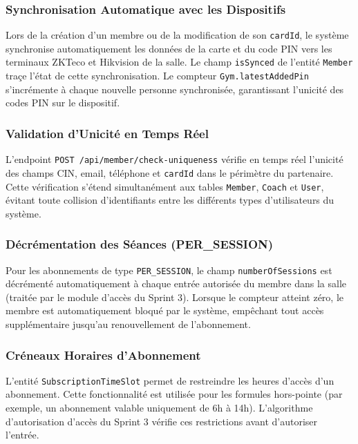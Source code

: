 ﻿\documentclass[../main.tex]{subfiles}
\begin{document}
\subsubsection{Synchronisation Automatique avec les Dispositifs}

Lors de la cr\'{e}ation d'un membre ou de la modification de son \texttt{cardId}, le syst\`{e}me synchronise automatiquement les donn\'{e}es de la carte et du code PIN vers les terminaux ZKTeco et Hikvision de la salle. Le champ \texttt{isSynced} de l'entit\'{e} \texttt{Member} tra\c{c}e l'\'{e}tat de cette synchronisation. Le compteur \texttt{Gym.latestAddedPin} s'incr\'{e}mente \`{a} chaque nouvelle personne synchronis\'{e}e, garantissant l'unicit\'{e} des codes PIN sur le dispositif.

\subsubsection{Validation d'Unicit\'{e} en Temps R\'{e}el}

L'endpoint \texttt{POST /api/member/check-uniqueness} v\'{e}rifie en temps r\'{e}el l'unicit\'{e} des champs CIN, email, t\'{e}l\'{e}phone et \texttt{cardId} dans le p\'{e}rim\`{e}tre du partenaire. Cette v\'{e}rification s'\'{e}tend simultan\'{e}ment aux tables \texttt{Member}, \texttt{Coach} et \texttt{User}, \'{e}vitant toute collision d'identifiants entre les diff\'{e}rents types d'utilisateurs du syst\`{e}me.

\subsubsection{D\'{e}cr\'{e}mentation des S\'{e}ances (PER\_SESSION)}

Pour les abonnements de type \texttt{PER\_SESSION}, le champ \texttt{numberOfSessions} est d\'{e}cr\'{e}ment\'{e} automatiquement \`{a} chaque entr\'{e}e autoris\'{e}e du membre dans la salle (trait\'{e}e par le module d'acc\`{e}s du Sprint 3). Lorsque le compteur atteint z\'{e}ro, le membre est automatiquement bloqu\'{e} par le syst\`{e}me, emp\^{e}chant tout acc\`{e}s suppl\'{e}mentaire jusqu'au renouvellement de l'abonnement.

\subsubsection{Cr\'{e}neaux Horaires d'Abonnement}

L'entit\'{e} \texttt{SubscriptionTimeSlot} permet de restreindre les heures d'acc\`{e}s d'un abonnement. Cette fonctionnalit\'{e} est utilis\'{e}e pour les formules hors-pointe (par exemple, un abonnement valable uniquement de 6h \`{a} 14h). L'algorithme d'autorisation d'acc\`{e}s du Sprint 3 v\'{e}rifie ces restrictions avant d'autoriser l'entr\'{e}e.
\end{document}
